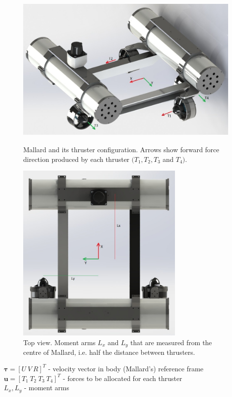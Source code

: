 \documentclass{report}
\begin{document}
	
		
	\begin{figure}[H]  %
		\centering      %
		\includegraphics[height=8cm]{figures/Mallard_skewed}
		\caption{Mallard and its thruster configuration. Arrows show forward force direction produced by each thruster $(T_1,T_2,T_3$ and $T_4 )$.}	
		\label{mallard_skewed}
	\end{figure}

	
		
		
	\begin{figure}[H]  %
		\centering      %
		\includegraphics[height=9cm]{figures/Mallard_top}
		\caption{Top view. Moment arms $L_x$ and $L_y$ that are measured 
			from the centre of Mallard, i.e. half the distance between thrusters. }	
		\label{mallard_top}
	\end{figure}
	
	\noindent
	$\boldsymbol{\tau} = [U~V~R]^T$ - velocity vector in body (Mallard's) reference frame \\
	$\boldsymbol{u} =  [T_1~T_2~T_3~T_4]^T$ - forces to be allocated for each thruster\\
	$L_x,L_y$ - moment arms\\\\
	
\end{document}
